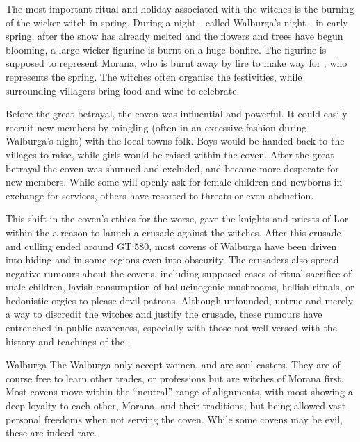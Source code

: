 The most important ritual and holiday associated with the witches is the burning
of the wicker witch in spring. During a night - called Walburga's night - in
early spring, after the snow has already melted and the flowers and trees have
begun blooming, a large wicker figurine is burnt on a huge bonfire. The figurine
is supposed to represent Morana, who is burnt away by fire to make way for
, who represents the spring. The witches often organise the
festivities, while surrounding villagers bring food and wine to celebrate.

Before the great betrayal, the coven was influential and powerful. It could
easily recruit new members by mingling (often in an excessive fashion during
Walburga's night) with the local towns folk. Boys would be handed back to the
villages to raise, while girls would be raised within the coven. After the
great betrayal the coven was shunned and excluded, and became more desperate
for new members. While some will openly ask for female children and newborns
in exchange for services, others have resorted to threats or even abduction.

This shift in the coven's ethics for the worse, gave the knights and
priests of Lor within the  a reason to
launch a crusade against the witches. After this crusade and culling ended
around GT:580, most covens of Walburga have been driven into hiding and in
some regions even into obscurity. The crusaders also spread negative rumours
about the covens, including supposed cases of ritual sacrifice of male children,
lavish consumption of hallucinogenic mushrooms, hellish rituals, or hedonistic
orgies to please devil patrons. Although unfounded, untrue and merely a way to
discredit the witches and justify the crusade, these rumours have entrenched
in public awareness, especially with those not well versed with the history
and teachings of the .


\begin{35e}{Walburga}
  The Walburga only accept women, and are soul casters. They are of course free
  to learn other trades, or professions but are witches of Morana first. Most
  covens move within the ``neutral'' range of alignments, with most showing a
  deep loyalty to each other, Morana, and their traditions; but being allowed
  vast personal freedoms when not serving the coven. While some covens may be
  evil, these are indeed rare.
\end{35e}
